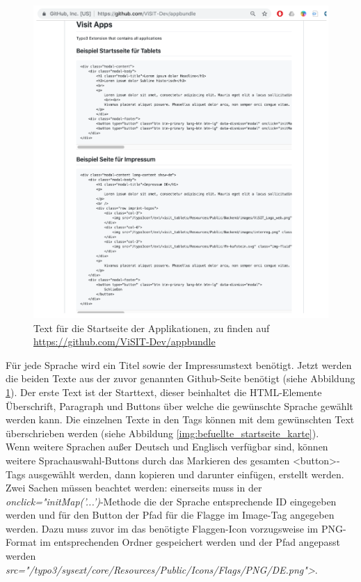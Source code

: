 \begin{figure}[ht!]
\centering
\includegraphics[width=12cm]{Figures/paula/karte/github_link.png}
\caption{Text für die Startseite der Applikationen, zu finden auf \url{https://github.com/ViSIT-Dev/appbundle}}
\label{img:github_link}
\end{figure}

Für jede Sprache wird ein Titel sowie der Impressumstext benötigt. Jetzt werden die beiden Texte aus der zuvor genannten Github-Seite benötigt (siehe Abbildung \ref{img:github_link}). Der erste Text ist der Starttext, dieser beinhaltet die HTML-Elemente Überschrift, Paragraph und Buttons über welche die gewünschte Sprache gewählt werden kann. Die einzelnen Texte in den Tags können mit dem gewünschten Text überschrieben werden (siehe Abbildung \ref{img:befuellte_startseite_karte}).\\
Wenn weitere Sprachen außer Deutsch und Englisch verfügbar sind, können weitere Sprachauswahl-Buttons durch das Markieren des gesamten <button>-Tags ausgewählt werden, dann kopieren und darunter einfügen, erstellt werden. Zwei Sachen müssen beachtet werden: einerseits muss in der \textit{onclick="initMap('...')}-Methode die der Sprache entsprechende ID eingegeben werden und für den Button der Pfad für die Flagge im Image-Tag angegeben werden. Dazu muss zuvor im das benötigte Flaggen-Icon vorzugsweise im PNG-Format im entsprechenden Ordner gespeichert werden und der Pfad angepasst werden\\ \textit{src="/typo3/sysext/core/Resources/Public/Icons/Flags/PNG/DE.png">}. 

